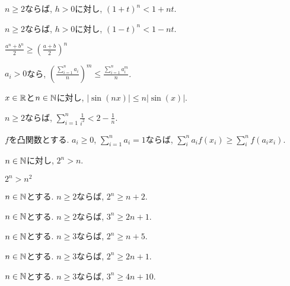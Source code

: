 \begin{prop}
  $n\geq 2$ならば,  $h>0$に対し,
$(1+t)^n<1+nt$.
\end{prop}
\begin{prop}
  $n\geq 2$ならば,  $h>0$に対し,
$(1-t)^n<1-nt$.
\end{prop}

\begin{prop}
$\frac{a^n+b^n}{2}\geq \left(\frac{a+b}{2}\right)^n$
\end{prop}

\begin{prop}
  $a_i>0$なら,
  $\left(\frac{\sum_{i=1}^n a_i}{n}\right)^m \leq \frac{\sum_{i=1}^{n}a_i^m}{n}$.
\end{prop}

\begin{prop}
$x\in\mathbb{R}$と$n\in\mathbb{N}$に対し, $|\sin(nx)|\leq n|\sin(x)|$.
\end{prop}

\begin{prop}
  $n\geq 2$ならば,
  $\sum_{i=1}^{n}\frac{1}{i^2}<2-\frac{1}{n}$.
\end{prop}

\begin{prop}
  $f$を凸関数とする.
  $a_i\geq 0$, $\sum_{i=1}^n a_i=1$ならば,
  $\sum_{i}^{n} a_i f(x_i)\geq \sum_{i}^{n}  f(a_i x_i)$.
\end{prop}


\begin{prop}
$n\in\mathbb{N}$に対し, $2^n> n$.
\end{prop}

\begin{prop}
  $2^n>n^2$
\end{prop}

\begin{prop}
$n\in\mathbb{N}$とする.
  $n\geq 2$ならば, $2^n \geq n+2$.
\end{prop}

\begin{prop}
$n\in\mathbb{N}$とする.
  $n\geq 2$ならば, $3^n \geq 2n+1$.
\end{prop}


\begin{prop}
$n\in\mathbb{N}$とする.
  $n\geq 3$ならば, $2^n\geq n+5$.
\end{prop}

\begin{prop}
$n\in\mathbb{N}$とする.
  $n\geq 3$ならば, $2^n\geq 2n+1$.
\end{prop}

\begin{prop}
$n\in\mathbb{N}$とする.
  $n\geq 3$ならば, $3^n\geq 4n+10$.
\end{prop}

